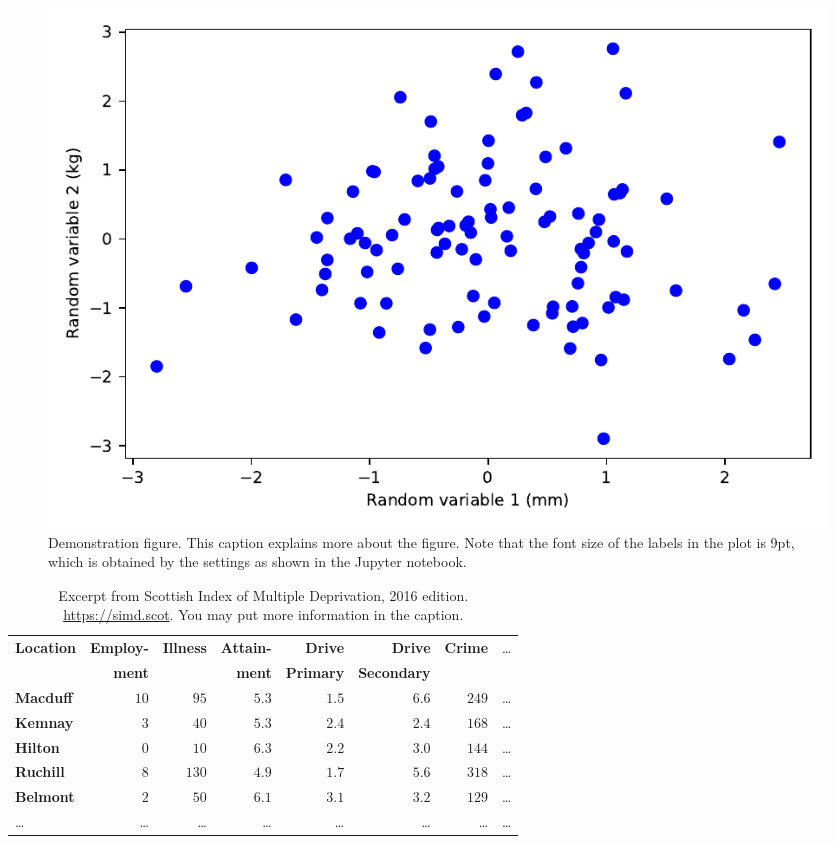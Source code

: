 \documentclass[11pt,a4paper]{article}
\begin{document}
\begin{figure}[t]
  \centering
  \includegraphics{example1}
  \caption{Demonstration figure. This caption explains more about the
    figure. Note that the font size of the labels in the plot is 9pt,
    which is obtained by the settings as shown in the Jupyter
    notebook.}
  \label{fds-project-template:fig:example1}
\end{figure}

\begin{table}[b]
  \caption{Excerpt from Scottish Index of Multiple Deprivation, 2016 edition.
    \url{https://simd.scot}. You may put more information in the caption.}
  \label{tab:example1}
\begin{tabular}{lrrrrrrr}
\hline\hline
\textbf{Location}&\textbf{Employ-}&\textbf{Illness}&\textbf{Attain-}&\textbf{Drive}  &\textbf{Drive}    &\textbf{Crime}&\dots\\
                 &\textbf{ment}   &                &\textbf{ment}   &\textbf{Primary}&\textbf{Secondary}&              &\\
\hline
\textbf{Macduff}&$10$&$ 95$&$5.3$&$1.5$&$6.6$&$249$&\dots\tabularnewline
\textbf{Kemnay}&$ 3$&$ 40$&$5.3$&$2.4$&$2.4$&$168$&\dots\tabularnewline
\textbf{Hilton}&$ 0$&$ 10$&$6.3$&$2.2$&$3.0$&$144$&\dots\tabularnewline
\textbf{Ruchill}&$ 8$&$130$&$4.9$&$1.7$&$5.6$&$318$&\dots\tabularnewline
\textbf{Belmont}&$ 2$&$ 50$&$6.1$&$3.1$&$3.2$&$129$&\dots\tabularnewline
\dots&\dots&\dots&\dots&\dots&\dots&\dots&\dots\tabularnewline
\hline
\end{tabular}
\end{table}
\end{document}
